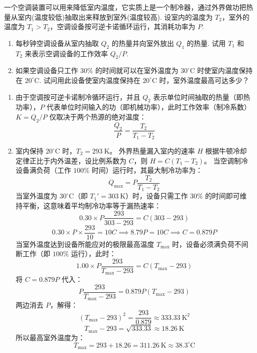 \begin{exercise}\label{ex:11.12}
一个空调装置可以用来降低室内温度，它实质上是一个制冷器，通过外界做功把热量从室内(温度较低)抽取出来释放到室外(温度较高). 设室内的温度为 $T_2$，室外的温度为 $T_1 > T_2$，空调设备按可逆卡诺循环运行，其消耗功率为 $P$.
\begin{enumerate}
  \item[(a)] 每秒钟空调设备从室内抽取 $Q_2$ 的热量并向室外放出 $Q_1$ 的热量. 试用 $T_1$ 和 $T_2$ 来表示空调设备的工作效率 $Q_2/P$.
  \item[(b)] 如果空调设备只工作 $30\%$ 的时间就可以在室外温度为 $30^\circ\mathrm{C}$ 时使室内温度保持在 $20^\circ\mathrm{C}$. 试问用此设备使室内温度保持在 $20^\circ\mathrm{C}$ 时，室外温度最高可达多少？
\end{enumerate}
\end{exercise}
\begin{solution}
\begin{enumerate}
    \item[(a)] 由于空调按可逆卡诺制冷循环运行，并且 $Q_2$ 表示单位时间抽取的热量（即热功率），$P$ 代表单位时间输入的功（即机械功率），此时工作效率（制冷系数）$K = Q_2/P$ 仅取决于两个热源的绝对温度：
    $$ \frac{Q_2}{P} = \frac{T_2}{T_1 - T_2} $$

    \item[(b)] 室内保持 $20^\circ\mathrm{C}$ 时，$T_2 = 293 \ \mathrm{K}$。
    外界热量漏入室内的速率 $H$ 根据牛顿冷却定律正比于内外温差，设比例系数为 $C$，则 $H = C(T_1 - T_2)$。
    当空调制冷设备满负荷（工作 $100\%$ 时间）运行时，其最大制冷功率为：
    $$ \dot{Q}_{\max} = P \frac{T_2}{T_1 - T_2} $$
    当室外温度为 $30^\circ\mathrm{C}$（即 $T_1' = 303 \ \mathrm{K}$）时，设备只需工作 $30\%$ 的时间即可维持平衡，这意味着平均制冷功率等于漏热速率：
    $$ 0.30 \times P \frac{293}{303 - 293} = C(303 - 293) $$
    $$ 0.30 \times P \times \frac{293}{10} = 10 C \implies 8.79 P = 10 C \implies C = 0.879 P $$
    当室外温度达到设备所能应对的极限最高温度 $T_{\max}$ 时，设备必须满负荷不间断工作（即 $100\%$ 运行），此时：
    $$ 1.00 \times P \frac{293}{T_{\max} - 293} = C(T_{\max} - 293) $$
    将 $C = 0.879 P$ 代入：
    $$ P \frac{293}{T_{\max} - 293} = 0.879 P (T_{\max} - 293) $$
    两边消去 $P$，解得：
    $$ (T_{\max} - 293)^2 = \frac{293}{0.879} \approx 333.33 \ \mathrm{K^2} $$
    $$ T_{\max} - 293 = \sqrt{333.33} \approx 18.26 \ \mathrm{K} $$
    所以最高室外温度为：
    $$ T_{\max} = 293 + 18.26 = 311.26 \ \mathrm{K} \approx 38.3^\circ\mathrm{C} $$
\end{enumerate}
\end{solution}

